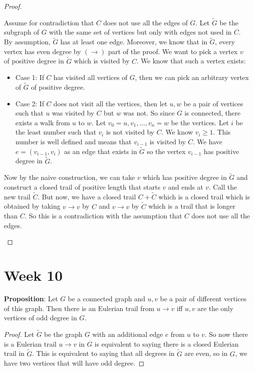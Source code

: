 \documentclass{report}
\begin{document}
\begin{proof}
\begin{itemize}
            Assume for contradiction that $C$ does not use all the edges of $G$. Let $\tilde{G}$ be the subgraph of $G$ with the same set of vertices but only with edges not used in $C$. By assumption, $\tilde{G}$ has at least one edge. Moreover, we know that in $\tilde{G}$, every vertex has even degree by $(\rightarrow)$ part of the proof. We want to pick a vertex $v$ of positive degree in $\tilde{G}$ which is visited by $C$. We know that such a vertex exists:
                \begin{itemize}
                    \item Case 1: If $C$ has visited all vertices of $G$, then we can pick an arbitrary vertex of $\tilde{G}$ of positive degree.

                    \item Case 2: If $C$ does not visit all the vertices, then let $u, w$ be a pair of vertices such that $u$ was visited by $C$ but $w$ was not. So since $G$ is connected, there exists a walk from $u$ to $w$. Let $v_{0} = u, v_{1}, \ldots, v_{n} = w$ be the vertices. Let $i$ be the least number such that $v_{i}$ is not visited by $C$. We know $v_{i} \geq1$. This number is well defined and means that $v_{i - 1}$ is visited by $C$. We have $e = (v_{i- 1}, v_{i})$ as an edge that exists in $\tilde{G}$ so the vertex $v_{i - 1}$ has positive degree in $\tilde{G}$. 
                \end{itemize}
            Now by the naive construction, we can take $v$ which has positive degree in $\tilde{G}$ and construct a closed trail of positive length that starts $v$ and ends at $v$. Call the new trail $\tilde{C}$. But now, we have a closed trail $C + \tilde{C}$ which is a closed trail which is obtained by taking $v \rightarrow v$ by $C$ and $v \rightarrow v$ by $\tilde{C}$ which is a trail that is longer than $C$. So this is a contradiction with the assumption that $C$ does not use all the edges.
        \end{itemize}
    \end{proof}

\chapter{Week 10}

\textbf{Proposition}: Let $G$ be a connected graph and $u, v$ be a pair of different vertices of this graph. Then there is an Eulerian trail from $u \rightarrow v$ iff $u, v$ are the only vertices of odd degree in $G$.
    \begin{proof}
        Let $\tilde{G}$ be the graph $G$ with an additional edge $e$ from $u$ to $v$. So now there is a Eulerian trail $u \rightarrow v$ in $G$ is equivalent to saying there is a closed Eulerian trail in $\tilde{G}$. This is equivalent to saying that all degrees in $\tilde{G}$ are even, so in $G$, we have two vertices that will have odd degree.
    \end{proof}
\end{document}
